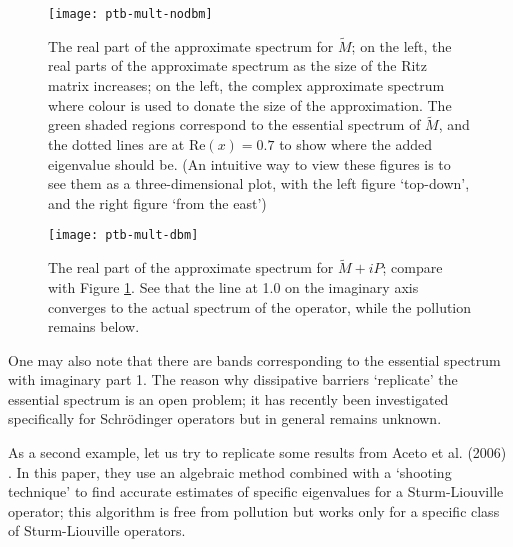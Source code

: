 \documentclass[../main.tex]{subfiles}
\begin{document}
\begin{figure}[p!]
\texttt{[image: ptb-mult-nodbm]}
\caption{The real part of the approximate spectrum for $\tilde{M}$; on the left, the real parts of the approximate spectrum as the size of the Ritz matrix increases;
on the left, the complex approximate spectrum where colour is used to donate the size of the approximation. The green shaded regions correspond to
the essential spectrum of $\tilde{M}$, and the dotted lines are at $\mathrm{Re}(x) = 0.7$ to show where the added eigenvalue should be. 
(An intuitive way to view these figures is to see them as a three-dimensional plot, with the left figure `top-down', and the right figure `from the east')}
\label{fig:nodbm}
\end{figure}

\begin{figure}[p!]
\texttt{[image: ptb-mult-dbm]} 
\caption{The real part of the approximate spectrum for $\tilde{M}+iP$; compare with Figure \ref{fig:nodbm}. See that the line at 1.0 on the imaginary
axis converges to the actual spectrum of the operator, while the pollution remains below.}
\label{fig:dbm}
\end{figure}
\clearpage

\begin{remark}
One may also note that there are bands corresponding to the essential spectrum with imaginary part 1. 
The reason why dissipative barriers `replicate' the essential spectrum is an open problem; it has recently been investigated specifically for Schr\"odinger operators \cite{stepanenkoTODO} but in general remains unknown.
\end{remark}

As a second example, let us try to replicate some results from Aceto et al. (2006) \cite{aceto2006numerical}. In this paper, they use an algebraic method
combined with a `shooting technique' to find accurate estimates of specific eigenvalues for a Sturm-Liouville operator; this algorithm is free from pollution but works only for a specific class of Sturm-Liouville operators.
\end{document}
